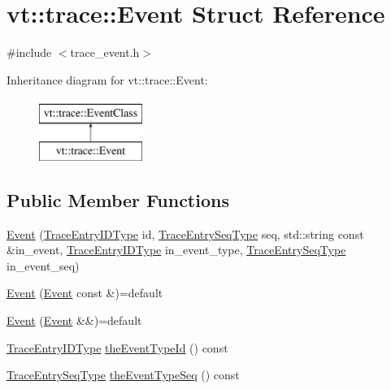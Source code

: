 \hypertarget{structvt_1_1trace_1_1_event}{}\section{vt\+:\+:trace\+:\+:Event Struct Reference}
\label{structvt_1_1trace_1_1_event}


{\ttfamily \#include $<$trace\+\_\+event.\+h$>$}

Inheritance diagram for vt\+:\+:trace\+:\+:Event\+:\begin{figure}[H]
\begin{center}
\leavevmode
\includegraphics[height=2.000000cm]{structvt_1_1trace_1_1_event}
\end{center}
\end{figure}
\subsection*{Public Member Functions}
\begin{DoxyCompactItemize}
\item 
\hyperlink{structvt_1_1trace_1_1_event_a6453f6c296f047b7caa653212c09da06}{Event} (\hyperlink{namespacevt_1_1trace_a3c14050715ba9eceaeff51fb3de64f2f}{Trace\+Entry\+I\+D\+Type} id, \hyperlink{namespacevt_1_1trace_a522028dd2a7d056f0ec3d417836fdecd}{Trace\+Entry\+Seq\+Type} seq, std\+::string const \&in\+\_\+event, \hyperlink{namespacevt_1_1trace_a3c14050715ba9eceaeff51fb3de64f2f}{Trace\+Entry\+I\+D\+Type} in\+\_\+event\+\_\+type, \hyperlink{namespacevt_1_1trace_a522028dd2a7d056f0ec3d417836fdecd}{Trace\+Entry\+Seq\+Type} in\+\_\+event\+\_\+seq)
\item 
\hyperlink{structvt_1_1trace_1_1_event_a4c9c1f89d57a79f7b51f16fd31ae578a}{Event} (\hyperlink{structvt_1_1trace_1_1_event}{Event} const \&)=default
\item 
\hyperlink{structvt_1_1trace_1_1_event_a286fcf42a1068659e4ce6429c604a8ec}{Event} (\hyperlink{structvt_1_1trace_1_1_event}{Event} \&\&)=default
\item 
\hyperlink{namespacevt_1_1trace_a3c14050715ba9eceaeff51fb3de64f2f}{Trace\+Entry\+I\+D\+Type} \hyperlink{structvt_1_1trace_1_1_event_aa977fc8868e6807f1bcf1df8bdc15588}{the\+Event\+Type\+Id} () const
\item 
\hyperlink{namespacevt_1_1trace_a522028dd2a7d056f0ec3d417836fdecd}{Trace\+Entry\+Seq\+Type} \hyperlink{structvt_1_1trace_1_1_event_a8479476d6d9a816d78d0a341df438626}{the\+Event\+Type\+Seq} () const
\end{DoxyCompactItemize}
